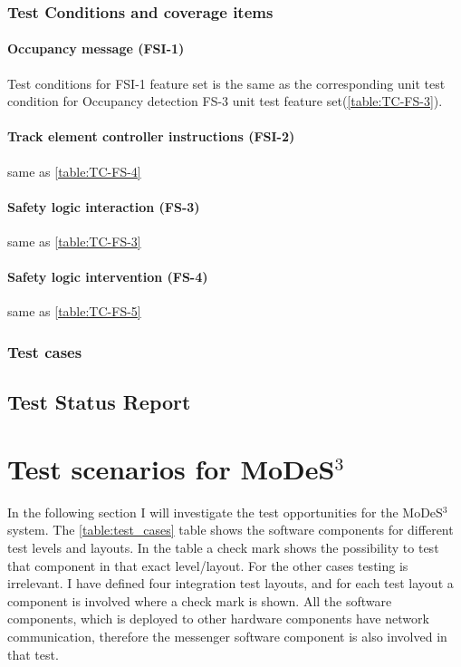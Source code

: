 \subsubsection{Test Conditions and coverage items}
\paragraph{Occupancy message (FSI-1)} Test conditions for FSI-1 feature set is the same as the corresponding unit test condition for Occupancy detection FS-3 unit test feature set(\autoref{table:TC-FS-3}).
\paragraph{Track element controller instructions (FSI-2)} same as \autoref{table:TC-FS-4}
\paragraph{Safety logic interaction (FS-3)} same as \autoref{table:TC-FS-3}
\paragraph{Safety logic intervention (FS-4)} same as \autoref{table:TC-FS-5}

\subsubsection{Test cases}

















\subsection{Test Status Report}




\section{Test scenarios for MoDeS$^3$}
In the following section I will investigate the test opportunities for the MoDeS$^3$ system.  The \ref{table:test_cases} table shows the software components for different test levels and layouts. In the table a check mark shows the possibility to test that component in that exact level/layout. For the other cases testing is irrelevant. I have defined four integration test layouts, and for each test layout a component is involved where a check mark is shown. All the software components, which is deployed to other hardware components have network communication, therefore the messenger software component is also involved in that test.


